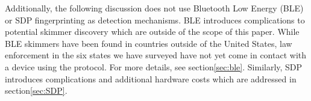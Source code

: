 Additionally, the following discussion does not use Bluetooth Low Energy (BLE) or SDP fingerprinting as detection
mechanisms.
%
BLE introduces complications to potential skimmer discovery which are outside of the scope of this paper.
%
While BLE skimmers have been found in countries outside of the United States, law enforcement in the six states we have
surveyed have not yet come in contact with a device using the protocol.
%
For more details, see section\ref{sec:ble}.
%
Similarly, SDP introduces complications and additional hardware costs which are addressed in section\ref{sec:SDP}.


%
%
%



